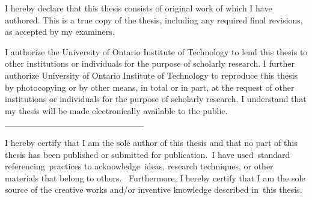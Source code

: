 \begin{declaration}
\addchaptertocentry{\authorshipname} %

I hereby declare that this thesis consists of original work of which I have authored. This is a true copy of the thesis, including any required final revisions, as accepted by my examiners.

I authorize the University of Ontario Institute of Technology to lend this thesis to other institutions or individuals for the purpose of scholarly research. I further authorize University of Ontario Institute of Technology to reproduce this thesis by photocopying or by other means, in total or in part, at the request of other institutions or individuals for the purpose of scholarly research. I understand that my thesis will be made electronically available to the public.\\

\vspace{\baselineskip}
{\setlength{\parindent}{0cm}\_\_\_\_\_\_\_\_\_\_\_\_\_\_\_\_\_\_\_\_\_\_ \ \tab \authorname}
 
%
\end{declaration}




%
\begin{contributions}
\addchaptertocentry{\contributionsname} 

I hereby certify that I am the sole author of this thesis and that no part of this thesis has been published or submitted for publication. I have used standard referencing practices to acknowledge ideas, research techniques, or other materials that belong to others.  Furthermore, I hereby certify that I am the sole source of the creative works and/or inventive knowledge described in this thesis.

\end{contributions}

